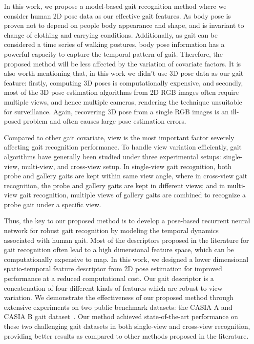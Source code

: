 In this work, we propose a model-based gait recognition method where we consider human 2D pose data as our effective gait features. As body pose is proven not to depend on people body appearance and shape, and is invariant to change of clothing and carrying conditions. Additionally, as gait can be considered a time series of walking postures, body pose information has a powerful capacity to capture the temporal pattern of gait. Therefore, the proposed method will be less affected by the variation of covariate factors. It is also worth mentioning that, in this work we didn't use 3D pose data as our gait feature: firstly, computing 3D poses is computationally expensive, and secondly, most of the 3D pose estimation algorithms from 2D RGB images often require multiple views, and hence multiple cameras, rendering the technique unsuitable for surveillance. Again, recovering 3D pose from a single RGB images is an ill-posed problem and often causes large pose estimation errors. 

Compared to other gait covariate, view is the most important factor severely affecting gait recognition performance. To handle view variation efficiently, gait algorithms have generally been studied under three experimental setups: single-view, multi-view, and cross-view setup. In single-view gait recognition, both probe and gallery gaits are kept within same view angle, where in cross-view gait recognition, the probe and gallery gaits are kept in different views; and in multi-view gait recognition, multiple views of gallery gaits are combined to recognize a probe gait under a specific view.

Thus, the key to our proposed method is to develop a pose-based recurrent neural network for robust gait recognition by modeling the temporal dynamics associated with human gait. Most of the descriptors proposed in the literature for gait recognition often lead to a high dimensional feature space, which can be computationally expensive to map. In this work, we designed a lower dimensional spatio-temporal feature descriptor from 2D pose estimation for improved performance at a reduced computational cost. Our gait descriptor is a concatenation of four different kinds of features which are robust to view variation. We demonstrate the effectiveness of our proposed method through extensive experiments on two public benchmark datasets:  the CASIA A and CASIA B gait dataset~\cite{Yu_06}. Our method achieved state-of-the-art performance on these two challenging gait datasets in both single-view and cross-view recognition, providing better results as compared to other methods proposed in the literature.

